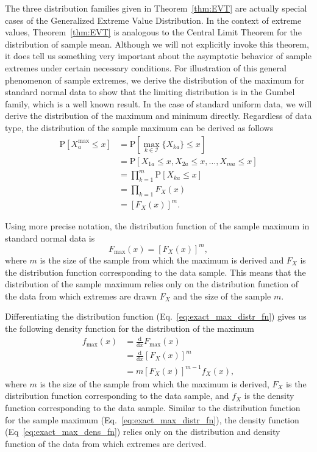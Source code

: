 \documentclass[10pt,letterpaper]{article}
\begin{document}
The three distribution families given in Theorem~\ref{thm:EVT} are actually special cases of the Generalized Extreme Value Distribution. In the context of extreme values, Theorem~\ref{thm:EVT} is analogous to the Central Limit Theorem for the distribution of sample mean.  Although we will not explicitly invoke this theorem, it does tell us something very important about the asymptotic behavior of sample extremes under certain necessary conditions. For illustration of this general phenomenon of sample extremes, we derive the distribution of the maximum for standard normal data to show that the limiting distribution is in the Gumbel family, which is a well known result. In the case of standard uniform data, we will derive the distribution of the maximum and minimum directly. Regardless of data type, the distribution of the sample maximum can be derived as follows
%
\begin{equation}\label{eq:exact_max}
\begin{aligned}
\text{P}[X^\text{max}_a \leq x] &= \text{P}\left[\max_{k \in \mathcal{I}}\{X_{ka}\} \leq x\right] \\
&= \text{P}[X_{1a} \leq x, X_{2a} \leq x, \dots, X_{ma} \leq x] \\
&= \prod_{k = 1}^{m} \text{P}[X_{ka} \leq x] \\
&= \prod_{k=1} F_X(x) \\
&= [F_X(x)]^m.
\end{aligned}
\end{equation}

Using more precise notation, the distribution function of the sample maximum in standard normal data is
%
\begin{equation}\label{eq:exact_max_distr_fn}
F_\text{max}(x) = [F_X(x)]^m,
\end{equation}
%
where $m$ is the size of the sample from which the maximum is derived and $F_X$ is the distribution function corresponding to the data sample. This means that the distribution of the sample maximum relies only on the distribution function of the data from which extremes are drawn $F_X$ and the size of the sample $m$.

Differentiating the distribution function (Eq.~\ref{eq:exact_max_distr_fn}) gives us the following density function for the distribution of the maximum
%
\begin{equation}\label{eq:exact_max_dens_fn}
\begin{aligned}
f_\text{max}(x) &= \frac{\text{d}}{\text{d}x} F_\text{max}(x) \\
&= \frac{\text{d}}{\text{d}x} [F_X(x)]^m \\
&= m [F_X(x)]^{m-1} f_X(x),
\end{aligned}
\end{equation}
%
where $m$ is the size of the sample from which the maximum is derived, $F_X$ is the distribution function corresponding to the data sample, and $f_X$ is the density function corresponding to the data sample. Similar to the distribution function for the sample maximum (Eq.~\ref{eq:exact_max_distr_fn}), the density function (Eq~\ref{eq:exact_max_dens_fn}) relies only on the distribution and density function of the data from which extremes are derived.
\end{document}
